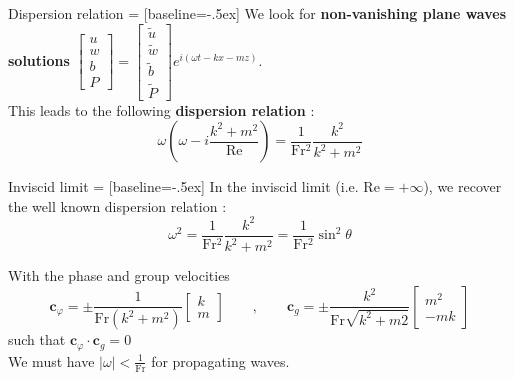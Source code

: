 \documentclass[10pt]{beamer}
\begin{document}
\begin{frame}[fragile]{Dispersion relation}
   = [baseline=-.5ex]
  We look for \textbf{non\--vanishing plane waves solutions} $\begin{bmatrix}u\\w\\b\\P\end{bmatrix}=\begin{bmatrix}\tilde{u}\\\tilde{w}\\\tilde{b}\\\tilde{P}\end{bmatrix}e^{\displaystyle i \left(\omega t-k x- m z\right)}$. \\
  This leads to the following \textbf{dispersion relation} :
  \begin{equation*}
    \omega\left(\omega-i\frac{k^{2}+m^{2}}{\mathrm{Re}}\right)=\frac{1}{\mathrm{Fr^{2}}}\frac{k^2}{k^2+m^2}
  \end{equation*}
\end{frame}

\begin{frame}[fragile]{Inviscid limit}
   = [baseline=-.5ex]
  In the inviscid limit (i.e. $\mathrm{Re}=+\infty$), we recover the well known dispersion relation :
  \begin{equation*}
    \omega^{2}=\frac{1}{\mathrm{Fr^{2}}}\frac{k^2}{k^2+m^2}=\frac{1}{\mathrm{Fr^{2}}}\sin^{2}\theta
  \end{equation*}

  With the phase and group velocities 
  \begin{equation*}
    \mathbf{c}_{\varphi}=\pm \frac{1}{\mathrm{Fr}\left(k^{2}+m^{2}\right)}\begin{bmatrix}k\\m\end{bmatrix} \qquad,\qquad \mathbf{c}_{g}=\pm \frac{k^{2}}{\mathrm{Fr}\sqrt{k^{2}+m{2}}} \begin{bmatrix} m^{2}\\-m k\end{bmatrix} 
  \end{equation*}
  such that $\mathbf{c}_{\varphi}\cdot\mathbf{c}_{g}=0$\\
  We must have $\left\lvert\omega\right\rvert<\frac{1}{\mathrm{Fr}}$ for propagating waves.
\end{frame}
\end{document}
